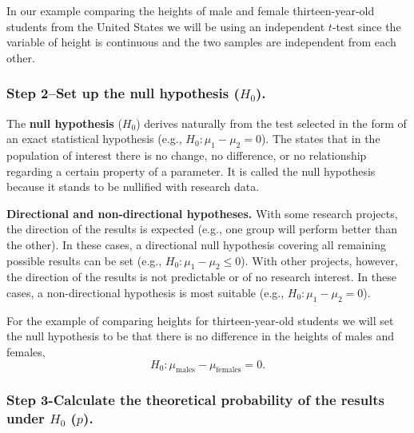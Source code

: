 \documentclass[
]{book}
\theoremstyle{definition}
\theoremstyle{definition}
\theoremstyle{definition}
\theoremstyle{definition}
\theoremstyle{remark}
\begin{document}
In our example comparing the heights of male and female thirteen-year-old students from the United States we will be using an independent \(t\)-test since the variable of height is continuous and the two samples are independent from each other.

\hypertarget{step-2set-up-the-null-hypothesis-h_0.}{%
\subsubsection*{\texorpdfstring{Step 2--Set up the null hypothesis (\(H_0\)).}{Step 2--Set up the null hypothesis (H\_0).}}\label{step-2set-up-the-null-hypothesis-h_0.}}

The \textbf{null hypothesis} (\(H_0\)) derives naturally from the test selected in the form of an exact statistical hypothesis (e.g., \(H_0: \mu_1-\mu_2 = 0\)). The states that in the population of interest there is no change, no difference, or no relationship regarding a certain property of a parameter. It is called the null hypothesis because it stands to be nullified with research data.

\textbf{Directional and non-directional hypotheses.} With some research projects, the direction of the results is expected (e.g., one group will perform better than the other). In these cases, a directional null hypothesis covering all remaining possible results can be set (e.g., \(H_0: \mu_1-\mu_2 \leq 0\)). With other projects, however, the direction of the results is not predictable or of no research interest. In these cases, a non-directional hypothesis is most suitable (e.g., \(H_0: \mu_1-\mu_2 = 0\)).

For the example of comparing heights for thirteen-year-old students we will set the null hypothesis to be that there is no difference in the heights of males and females, \[H_0: \mu_{\mbox{males}} - \mu_{\mbox{females}} = 0.\]

\hypertarget{step-3-calculate-the-theoretical-probability-of-the-results-under-h_0-p.}{%
\subsubsection*{\texorpdfstring{Step 3-Calculate the theoretical probability of the results under \(H_0\) (\(p\)).}{Step 3-Calculate the theoretical probability of the results under H\_0 (p).}}\label{step-3-calculate-the-theoretical-probability-of-the-results-under-h_0-p.}}
\end{document}
